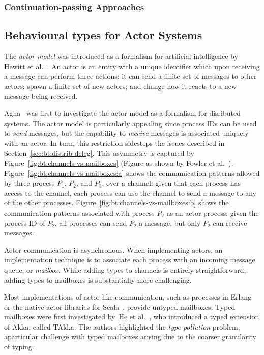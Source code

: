 \documentclass[
graybox,
envcountchap
]{svmult}
\begin{document}
\begin{bibunit}
  \subsubsection{Continuation-passing Approaches}

  \subsection{Behavioural types for Actor Systems}\label{sec:bt:actor-types}
  The \emph{actor model} was introduced as a formalism for artificial
  intelligence by Hewitt et al.~\cite{HewittBS73:actors}. An actor is an entity with a
  unique identifier which upon receiving a message can perform
  three actions: it can send a finite set of messages to other actors; spawn a
  finite set of new actors; and change how it reacts to a new message being
  received.

  

  Agha~\cite{Agha90:actors} was first to investigate the actor model as a formalism
  for disributed systems. The actor model is particularly appealing since
  process IDs can be used to \emph{send} messages, but the capability to
  \emph{receive} messages is associated uniquely with an actor. In turn, this
  restriction sidesteps the issues described in
  Section~\ref{sec:bt:distrib-deleg}.
  This asymmetry is captured by Figure~\ref{fig:bt:channels-vs-mailboxes} (Figure
  as shown by Fowler et al.~\cite{FowlerLW17:mm}). Figure~\ref{fig:bt:channels-vs-mailboxes:a}
  shows the communication patterns allowed by three process $P_1$, $P_2$, and
  $P_3$, over a channel: given that each process has access to the channel,
  each process can use the channel to send a message to any of the other
  processes. Figure~\ref{fig:bt:channels-vs-mailboxes:b} shows the communication
  patterns associated with process $P_2$ as an actor process: given the process
  ID of $P_2$, all processes can send $P_2$ a message, but only $P_2$ can
  receive messages.

  Actor communication is asynchronous. When implementing actors, an
  implementation technique is to associate each process with an incoming message
  queue, or \emph{mailbox}. While adding types to channels is entirely
  straightforward, adding types to mailboxes is substantially more challenging.

  Most implementations of actor-like communication, such as processes in
  Erlang~\cite{Armstrong10:erlang} or the native actor libraries for
  Scala~\cite{HallerO09:actors}, provide untyped mailboxes.
  Typed mailboxes were first investigated by~He et al.~\cite{HeWT14:actors}, who
  introduced a typed extension of Akka, called TAkka. The authors highlighted
  the \emph{type pollution} problem, aparticular challenge with typed mailboxes
  arising due to the coarser granularity of typing.


\end{bibunit}
\end{document}
